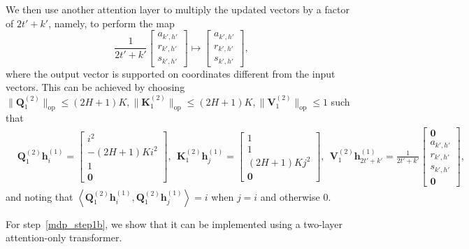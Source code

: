 \documentclass[10pt]{article}
\newcommand{\lops}[1]{\|{#1}\|_{\mathrm{op}}}
\newcommand{\<}{\left\langle}
\renewcommand{\>}{\right\rangle}
\renewcommand{\bQ}{\mathbf{Q}}
\newcommand{\bzero}{{\mathbf 0}}
\newcommand{\state}{{s}}
\newcommand{\action}{{a}}
\newcommand{\reward}{{r}}
\newcommand{\Numepi}{{K}}
\newcommand{\horizon}{{H}}
\renewcommand{\horizon}{{H}}
\def\bK{{\mathbf K}}
\def\bQ{{\mathbf Q}}
\def\bV{{\mathbf V}}
\def\bh{{\mathbf h}}
\begin{document}
We then use another  attention layer to  multiply the updated vectors by a factor of $2t'+k'$, namely, to perform the map
$$\frac{1}{2t'+k'}\begin{bmatrix}
        \action_{k',h'} \\\reward_{k',h'}\\\state_{k',h'}
    \end{bmatrix}\mapsto\begin{bmatrix}
        \action_{k',h'} \\\reward_{k',h'}\\\state_{k',h'}
    \end{bmatrix},$$ where the output vector is supported on coordinates different from the input vectors. This can be achieved by choosing $\lops{\bQ_1^{(2)}}\leq (2\horizon+1)\Numepi, \lops{\bK_1^{(2)}}\leq (2\horizon+1)\Numepi, \lops{\bV_1^{(2)}}\leq1$
such that \begin{align}
    &
\bQ^{(2)}_{1}\bh^{(1)}_{i}=\begin{bmatrix}
         i^2\\-(2\horizon+1)\Numepi i^2\\  1\\ \bzero
    \end{bmatrix},~~ \bK^{(2)}_{1}\bh^{(1)}_{j}=\begin{bmatrix}
        1\\1\\ (2\horizon+1)\Numepi j^2\\\bzero
    \end{bmatrix},~~
\bV^{(2)}_{1}\bh^{(1)}_{2t'+k'}=\frac{1}{2t'+k'}\begin{bmatrix}
        \bzero\\
        \action_{k',h'} \\\reward_{k',h'}\\\state_{k',h'}
    \\ \bzero
    \end{bmatrix},\label{eq:tf_constrcut_ucbvi_multi}
\end{align}
and noting that $\<\bQ^{(2)}_1\bh_i^{(1)},\bQ^{(2)}_1\bh_j^{(1)}\>=i$ when $j=i$ and otherwise $0$.

For step~\ref{mdp_step1b},  we show that it can be implemented using a two-layer attention-only transformer.
\end{document}

